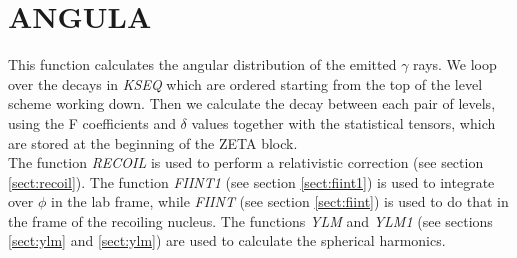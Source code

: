 \section{ANGULA}
\label{sect:angula}

\noindent This function calculates the angular distribution of the emitted
$\gamma$ rays. We loop over the decays in {\em KSEQ} which are ordered
starting from the top of the level scheme working down. Then we calculate
the decay between each pair of levels, using the F coefficients and $\delta$
values together with the statistical tensors, which are stored at the
beginning of the ZETA block.\\

\noindent The function {\em RECOIL} is used to perform a relativistic
correction (see section \ref{sect:recoil}). The function {\em FIINT1} (see
section \ref{sect:fiint1}) is used to integrate over $\phi$ in the lab
frame, while {\em FIINT} (see section \ref{sect:fiint}) is used to do that
in the frame of the recoiling nucleus. The functions {\em YLM} and {\em
YLM1} (see sections \ref{sect:ylm} and \ref{sect:ylm}) are used to calculate
the spherical harmonics.\\

